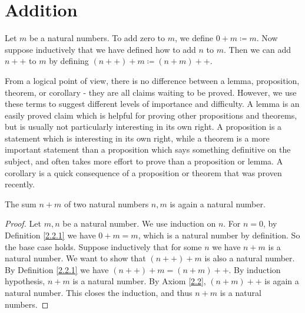 \section{Addition}\label{sec 2.2}

\begin{definition}\label{2.2.1}
    Let \(m\) be a natural numbers.
    To add zero to \(m\), we define \(0+m \coloneqq m\).
    Now suppose inductively that we have defined how to add \(n\) to \(m\).
    Then we can add \(n++\) to \(m\) by defining \((n++) + m \coloneqq (n + m)++\).
\end{definition}

\begin{note}
    From a logical point of view, there is no difference between a lemma, proposition, theorem, or corollary
    - they are all claims waiting to be proved.
    However, we use these terms to suggest different levels of importance and difficulty.
    A lemma is an easily proved claim which is helpful for proving other propositions and theorems, but is usually not particularly interesting in its own right.
    A proposition is a statement which is interesting in its own right, while a theorem is a more important statement than a proposition which says something definitive on the subject, and often takes more effort to prove than a proposition or lemma.
    A corollary is a quick consequence of a proposition or theorem that was proven recently.
\end{note}

\begin{additional corollary}\label{ac 2.2.1}
The sum \(n + m\) of two natural numbers \(n, m\) is again a natural number.
\end{additional corollary}

\begin{proof}
    Let \(m, n\) be a natural number.
    We use induction on \(n\).
    For \(n = 0\), by Definition \ref{2.2.1} we have \(0 + m = m\), which is a natural number by definition.
    So the base case holds.
    Suppose inductively that for some \(n\) we have \(n + m\) is a natural number.
    We want to show that \((n++) + m\) is also a natural number.
    By Definition \ref{2.2.1} we have \((n++) + m = (n + m)++\).
    By induction hypothesis, \(n + m\) is a natural number.
    By Axiom \ref{2.2}, \((n + m)++\) is again a natural number.
    This closes the induction, and thus \(n + m\) is a natural numbers.
\end{proof}

